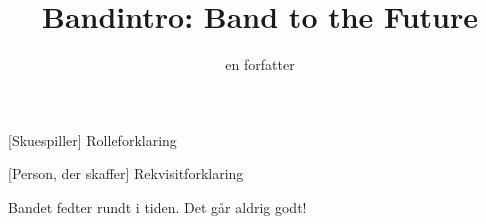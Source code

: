 \documentclass[a4paper,11pt]{article}
\title{Bandintro: Band to the Future}
\author{en forfatter}
\begin{document}
\maketitle

\begin{roles}
    [Skuespiller] Rolleforklaring
\end{roles}

\begin{props}
    [Person, der skaffer] Rekvisitforklaring
\end{props}


\begin{sketch}

Bandet fedter rundt i tiden. Det går aldrig godt!

\end{sketch}
\end{document}
